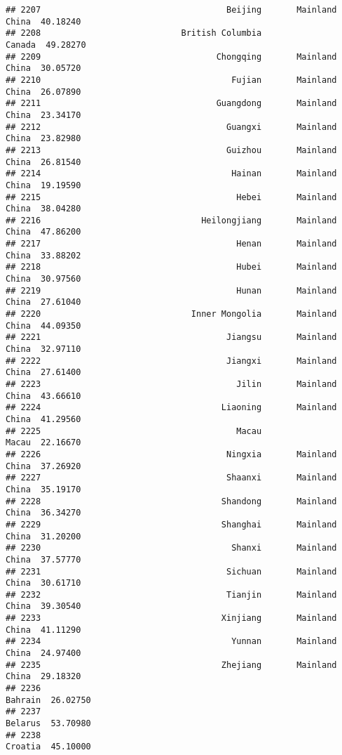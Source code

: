 \documentclass[
]{article}
\begin{document}
\begin{verbatim}
## 2207                                     Beijing       Mainland China  40.18240
## 2208                            British Columbia               Canada  49.28270
## 2209                                   Chongqing       Mainland China  30.05720
## 2210                                      Fujian       Mainland China  26.07890
## 2211                                   Guangdong       Mainland China  23.34170
## 2212                                     Guangxi       Mainland China  23.82980
## 2213                                     Guizhou       Mainland China  26.81540
## 2214                                      Hainan       Mainland China  19.19590
## 2215                                       Hebei       Mainland China  38.04280
## 2216                                Heilongjiang       Mainland China  47.86200
## 2217                                       Henan       Mainland China  33.88202
## 2218                                       Hubei       Mainland China  30.97560
## 2219                                       Hunan       Mainland China  27.61040
## 2220                              Inner Mongolia       Mainland China  44.09350
## 2221                                     Jiangsu       Mainland China  32.97110
## 2222                                     Jiangxi       Mainland China  27.61400
## 2223                                       Jilin       Mainland China  43.66610
## 2224                                    Liaoning       Mainland China  41.29560
## 2225                                       Macau                Macau  22.16670
## 2226                                     Ningxia       Mainland China  37.26920
## 2227                                     Shaanxi       Mainland China  35.19170
## 2228                                    Shandong       Mainland China  36.34270
## 2229                                    Shanghai       Mainland China  31.20200
## 2230                                      Shanxi       Mainland China  37.57770
## 2231                                     Sichuan       Mainland China  30.61710
## 2232                                     Tianjin       Mainland China  39.30540
## 2233                                    Xinjiang       Mainland China  41.11290
## 2234                                      Yunnan       Mainland China  24.97400
## 2235                                    Zhejiang       Mainland China  29.18320
## 2236                                                          Bahrain  26.02750
## 2237                                                          Belarus  53.70980
## 2238                                                          Croatia  45.10000

\end{verbatim}
\end{document}
